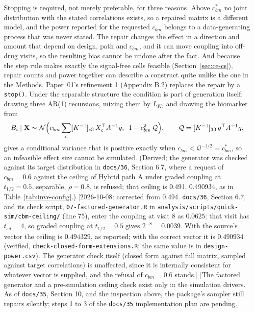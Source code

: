 \documentclass[11pt]{article}
\newcommand{\note}[1]{\textcolor{blue!60!black}{\small [#1]}}
\newcommand{\code}[1]{\texttt{#1}}
\begin{document}
Stopping is required, not merely preferable, for three reasons. Above
$c_{bm}^{\ast}$ no joint distribution with the stated correlations
exists, so a repaired matrix is a different model, and the power
reported for the requested $c_{bm}$ belongs to a data-generating
process that was never stated. The repair changes the effect in a
direction and amount that depend on design, path and $c_{bm}$, and it
can move coupling into off-drug visits, so the resulting bias cannot
be undone after the fact. And because the step rule makes exactly the
signal-free cells feasible (Section~\ref{sec:ce-cs}), repair counts
and power together can describe a construct quite unlike the one in
the Methods. Paper~01's refinement 1 (Appendix B.2) replaces the repair
by a \code{stop()}. Under the separable structure the condition is
part of generation itself: drawing three AR(1) recursions, mixing them
by $L_K$, and drawing the biomarker from
\begin{equation}
B_i \mid \mathbf X \sim \mathcal N\Bigl(c_{bm} \sum_{c} [K^{-1}]_{c3}\,
  X_c^{\top} A^{-1} g,\;\; 1 - c_{bm}^2\, \mathcal Q\Bigr), \qquad
\mathcal Q = [K^{-1}]_{33}\, g^{\top} A^{-1} g,
\label{eq:ce-factored}
\end{equation}
gives a conditional variance that is positive exactly when
$c_{bm} < \mathcal Q^{-1/2} = c_{bm}^{\ast}$, so an infeasible effect size
cannot be simulated. (Derived; the generator was checked against its
target distribution in \code{docs/36}, Section 6.7, where a request of
$c_{bm} = 0.6$ against the ceiling of Hybrid path A under graded
coupling at $t_{1/2} = 0.5$, separable, $\rho = 0.8$, is refused; that
ceiling is 0.491, 0.490934, as in Table~\ref{tab:inve-config}.)
\note{2026-10-08: corrected from 0.494. \code{docs/36}, Section 6.7, and
its check script, \code{07-factored-generator.R} in
\code{analysis/scripts/quick-sim/cbm-ceiling/} (line 75), enter the
coupling at visit 8 as $0.0625$; that visit has $t_{sd} = 4$, so graded
coupling at $t_{1/2} = 0.5$ gives $2^{-8} = 0.0039$. With the source's
vector the ceiling is $0.494329$, as reported; with the correct vector
it is $0.490934$ (verified, \code{check-closed-form-extensions.R}; the same value is in
\code{design-power.csv}). The generator check itself (closed form
against full matrix, sampled against target correlations) is
unaffected, since it is internally consistent for whatever vector is
supplied, and the refusal of $c_{bm} = 0.6$ stands.}
\note{The factored generator and a pre-simulation ceiling check exist
only in the simulation drivers. As of \code{docs/35}, Section 10, and
the inspection above, the package's sampler still repairs silently;
steps 1 to 3 of the \code{docs/35} implementation plan are pending.}
\end{document}

